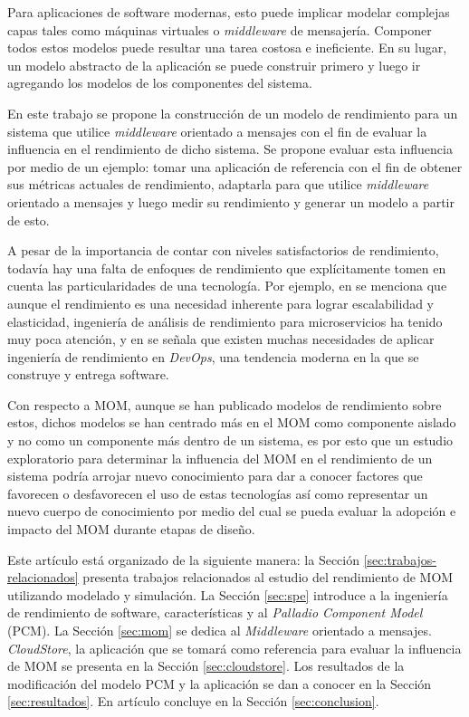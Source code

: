 \documentclass[conference]{IEEEtran}
\begin{document}
Para aplicaciones de software modernas, esto puede implicar modelar complejas capas tales como máquinas virtuales o \emph{middleware} de mensajería. Componer todos estos modelos puede resultar una tarea costosa e ineficiente. En su lugar, un modelo abstracto de la aplicación se puede construir primero y luego ir agregando los modelos de los componentes del sistema. 

En este trabajo se propone la construcción de un modelo de rendimiento para un sistema que utilice \emph{middleware} orientado a mensajes con el fin de evaluar la influencia en el rendimiento de dicho sistema. Se propone evaluar esta influencia por medio de un ejemplo: tomar una aplicación de referencia con el fin de obtener sus métricas actuales de rendimiento, adaptarla para que utilice \emph{middleware} orientado a mensajes y luego medir su rendimiento y generar un modelo a partir de esto.  

A pesar de la importancia de contar con niveles satisfactorios de rendimiento, todavía hay una falta de enfoques de rendimiento que explícitamente tomen en cuenta las particularidades de una tecnología. Por ejemplo, en \cite{microservices-challenges} se menciona que aunque el rendimiento es una necesidad inherente para lograr escalabilidad y elasticidad, ingeniería de análisis de rendimiento para microservicios ha tenido muy poca atención, y en \cite{performance-devops} se señala que existen muchas necesidades de aplicar ingeniería de rendimiento en \emph{DevOps}, una tendencia moderna en la que se construye y entrega software.

Con respecto a MOM, aunque se han publicado modelos de rendimiento sobre estos\cite{martinec-et-al}, dichos modelos se han centrado más en el MOM como componente aislado y no como un componente más dentro de un sistema, es por esto que un estudio exploratorio para determinar la influencia del MOM en el rendimiento de un sistema podría arrojar nuevo conocimiento para dar a conocer factores que favorecen o desfavorecen el uso de estas tecnologías así como representar un nuevo cuerpo de conocimiento por medio del cual se pueda evaluar la adopción e impacto del MOM durante etapas de diseño. 

Este artículo está organizado de la siguiente manera: la Sección \ref{sec:trabajos-relacionados} presenta trabajos relacionados al estudio del rendimiento de MOM utilizando modelado y simulación. La Sección \ref{sec:spe} introduce a la ingeniería de rendimiento de software, características y al \emph{Palladio Component Model} (PCM). La Sección \ref{sec:mom} se dedica al \emph{Middleware} orientado a mensajes. \emph{CloudStore}, la aplicación que se tomará como referencia para evaluar la influencia de MOM se presenta en la Sección \ref{sec:cloudstore}. Los resultados de la modificación del modelo PCM y la aplicación se dan a conocer en la Sección \ref{sec:resultados}. En artículo concluye en la Sección \ref{sec:conclusion}.
\end{document}
